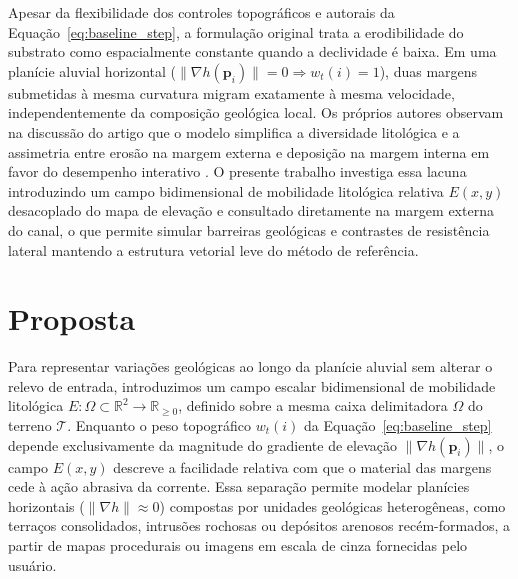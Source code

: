 \documentclass[9pt,a4paper,twocolumn]{extarticle}
\newif\ifmostrarorientacoes
\newcommand{\orientacao}[1]{%
  \ifmostrarorientacoes
    \par\smallskip
    \noindent\fcolorbox{black!35}{black!4}{%
      \parbox{0.94\columnwidth}{\fontsize{7.4}{8.2}\selectfont\textbf{Orientação aos autores:} #1}%
    }%
    \par\smallskip
  \fi
}
\begin{document}
Apesar da flexibilidade dos controles topográficos e autorais da Equação~\eqref{eq:baseline_step}, a formulação original trata a erodibilidade do substrato como espacialmente constante quando a declividade é baixa. Em uma planície aluvial horizontal ($\|\nabla h(\mathbf{p}_i)\| = 0 \Rightarrow w_t(i) = 1$), duas margens submetidas à mesma curvatura migram exatamente à mesma velocidade, independentemente da composição geológica local. Os próprios autores observam na discussão do artigo que o modelo simplifica a diversidade litológica e a assimetria entre erosão na margem externa e deposição na margem interna em favor do desempenho interativo \parencite{paris2023meandering}. O presente trabalho investiga essa lacuna introduzindo um campo bidimensional de mobilidade litológica relativa $E(x,y)$ desacoplado do mapa de elevação e consultado diretamente na margem externa do canal, o que permite simular barreiras geológicas e contrastes de resistência lateral mantendo a estrutura vetorial leve do método de referência.

\section{Proposta}
\orientacao{Descreva exatamente o que foi alterado, acrescentado ou investigado.
Diferencie o método original da contribuição da equipe. Use diagramas, pseudocódigo
ou equações quando melhorarem a reprodutibilidade.}

Para representar variações geológicas ao longo da planície aluvial sem alterar o relevo de entrada, introduzimos um campo escalar bidimensional de mobilidade litológica $E : \Omega \subset \mathbb{R}^2 \to \mathbb{R}_{\ge 0}$, definido sobre a mesma caixa delimitadora $\Omega$ do terreno $\mathcal{T}$. Enquanto o peso topográfico $w_t(i)$ da Equação~\eqref{eq:baseline_step} depende exclusivamente da magnitude do gradiente de elevação $\|\nabla h(\mathbf{p}_i)\|$, o campo $E(x,y)$ descreve a facilidade relativa com que o material das margens cede à ação abrasiva da corrente. Essa separação permite modelar planícies horizontais ($\|\nabla h\| \approx 0$) compostas por unidades geológicas heterogêneas, como terraços consolidados, intrusões rochosas ou depósitos arenosos recém-formados, a partir de mapas procedurais ou imagens em escala de cinza fornecidas pelo usuário.
\end{document}
